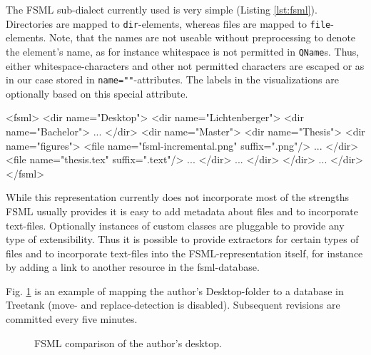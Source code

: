 The FSML sub-dialect currently used is very simple (Listing \ref{lst:fsml}). Directories are mapped to \texttt{dir}-elements, whereas files are mapped to \texttt{file}-elements. Note, that the names are not useable without preprocessing to denote the element's name, as for instance whitespace is not permitted in \texttt{QName}s. Thus, either whitespace-characters and other not permitted characters are escaped or as in our case stored in \texttt{name=""}-attributes. The labels in the visualizations are optionally based on this special attribute.

\begin{code}[caption={FSML structure.},label={lst:fsml}]
<fsml>
  <dir name="Desktop">
    <dir name="Lichtenberger">
      <dir name="Bachelor">
        ...
      </dir>
      <dir name="Master">
        <dir name="Thesis">
          <dir name="figures">
            <file name="fsml-incremental.png" suffix=".png"/>
            ...
          </dir>
          <file name="thesis.tex" suffix=".text"/>
          ...
        </dir>
        ...
      </dir>
    </dir>
    ...
  </dir>
</fsml>
\end{code}

While this representation currently does not incorporate most of the strengths FSML usually provides it is easy to add metadata about files and to incorporate text-files. Optionally instances of custom classes are pluggable to provide any type of extensibility. Thus it is possible to provide extractors for certain types of files and to incorporate text-files into the FSML-representation itself, for instance by adding a link to another resource in the fsml-database.

Fig. \ref{fig:fsml-item-size-pruning} is an example of mapping the author's Desktop-folder to a database in Treetank (move- and replace-detection is disabled). Subsequent revisions are committed every five minutes.

\begin{figure}[tb]
\caption{\label{fig:fsml-item-size-pruning} FSML comparison of the author's desktop.}
\end{figure}

